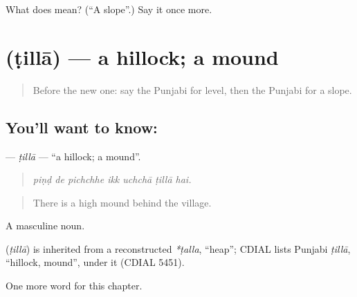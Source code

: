 \begin{tcolorbox}[breakable,colback=teal!4,colframe=teal!35!black,title={Before you move on}]
What does  mean? (\textquotedblleft{}A slope\textquotedblright{}.) Say it once more.
\end{tcolorbox}
\section[\texorpdfstring{\pa{ਟਿੱਲਾ} (ṭillā)}{ਟਿੱਲਾ (ṭillā)}]{ (ṭillā) — a hillock; a mound}

\label{lesson:PA-C293-tilla}



\begin{quote}
Before the new one: say the Punjabi for level, then the Punjabi for a slope.
\end{quote}

\subsection*{You'll want to know: }
\textbf{} — \emph{ṭillā} — \textquotedblleft{}a hillock; a mound\textquotedblright{}.

\begin{quote}
      
\end{quote}

\begin{quote}
\emph{piṇḍ de pichchhe ikk uchchā ṭillā hai.}
\end{quote}

\begin{quote}
There is a high mound behind the village.
\end{quote}

A masculine noun.

\begin{cousinweb}
\textbf{} (\emph{ṭillā}) is inherited from a reconstructed \emph{*ṭalla}, \textquotedblleft{}heap\textquotedblright{}; CDIAL lists Punjabi \emph{ṭillā}, \textquotedblleft{}hillock, mound\textquotedblright{}, under it (CDIAL 5451).
\end{cousinweb}

\begin{grammarlens}[title={What you've built}]
One more word for this chapter.
\end{grammarlens}


